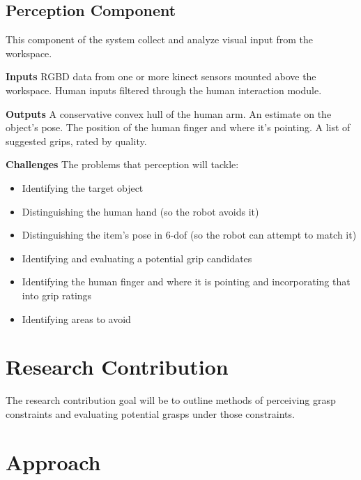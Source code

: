 \documentclass[10pt]{article}
\begin{document}
\subsection*{Perception Component}
This component of the system collect and analyze visual input from the workspace.
\par \textbf{Inputs} RGBD data from one or more kinect sensors mounted above the workspace. Human inputs filtered through the human interaction module.
\par \textbf{Outputs} A conservative convex hull of the human arm. An estimate on the object's pose. The position of the human finger and where it's pointing. A list of suggested grips, rated by quality.  
\par \textbf{Challenges} The problems that perception will tackle:
\begin{itemize}
\item Identifying the target object
\item Distinguishing the human hand (so the robot avoids it)
\item Distinguishing the item's pose in 6-dof (so the robot can attempt to match it)
\item Identifying and evaluating a potential grip candidates
\item Identifying the human finger and where it is pointing and incorporating that into grip ratings
\item Identifying areas to avoid
\end{itemize}

\section{Research Contribution} \label{sec:contribution}

The research contribution goal will be to outline methods of perceiving grasp constraints and evaluating potential grasps under those constraints. 

\section{Approach} \label{sec:approach}


\end{document}
